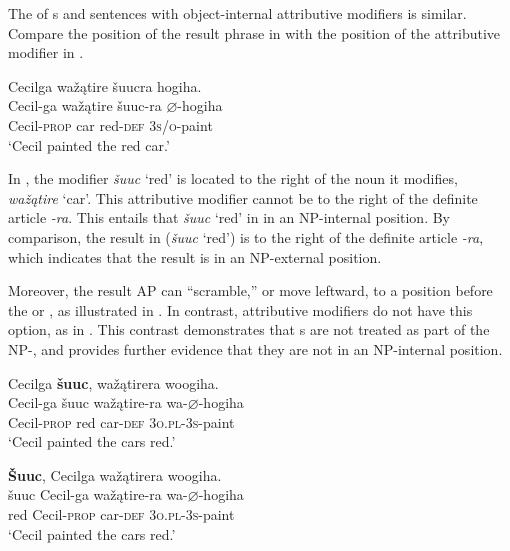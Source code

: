 \documentclass[output=paper]{LSP/langsci}
\begin{document}
The  of s and sentences with object-internal attributive modifiers is similar. Compare the position of the result phrase in  with the position of the attributive modifier in .

\begin{exe}
\ex\label{ex:rosen:8}
 \glll Cecilga wažątire šuucra hogiha. \\
Cecil-ga  wažątire šuuc-ra  {$\varnothing$}-hogiha\\
Cecil-\textsc{prop} car red-\textsc{def}  \textsc{3s/o}-paint\\
\glt `Cecil painted the red car.'

\end{exe}

In , the modifier \textit{šuuc} `red' is located to the right of the noun it modifies, \textit{wažątire} `car'. This attributive modifier cannot be to the right of the definite article \textit{-ra}. This entails that \textit{šuuc} `red' in  in an NP-internal position. By comparison, the result in  (\textit{šuuc} `red') is to the right of the definite article \textit{-ra}, which indicates that the result is in an NP-external position.

Moreover, the result AP can ``scramble,'' or move leftward, to a position before the  or , as illustrated in . In contrast, attributive modifiers do not have this option, as in . This contrast demonstrates that  s are not treated as part of the NP-, and provides further evidence that they are not in an NP-internal position.

\begin{exe}
\ex\label{ex:rosen:9}
\begin{xlist}

\ex \glll Cecilga \textbf{šuuc}, wažątirera woogiha. \\
 Cecil-ga šuuc  wažątire-ra wa-{$\varnothing$}-hogiha\\
 Cecil-\textsc{prop} red car-\textsc{def} \textsc{3o.pl}-\textsc{3s}-paint \\
\glt `Cecil painted the cars red.'

\ex \glll \textbf{\v{S}uuc}, Cecilga wažątirera woogiha. \\
  šuuc Cecil-ga wažątire-ra wa-{$\varnothing$}-hogiha\\
red Cecil-\textsc{prop} car-\textsc{def} \textsc{3o.pl}-\textsc{3s}-paint \\
\glt `Cecil painted the cars red.'

\end{xlist}




\end{exe}
\end{document}
